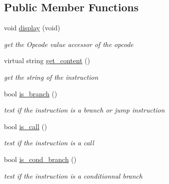 \subsection*{Public Member Functions}
\begin{DoxyCompactItemize}
\item 
void \mbox{\hyperlink{class_instruction_a0bae837f79caa83504ad14172bf6addf}{display}} (void)
\begin{DoxyCompactList}\small\item\em get the Opcode value accessor of the opcode \end{DoxyCompactList}\item 
\mbox{\label{class_instruction_a5b258bf1dfb9f6fa2fff0af0e7c211d8}} 
virtual string \mbox{\hyperlink{class_instruction_a5b258bf1dfb9f6fa2fff0af0e7c211d8}{get\+\_\+content}} ()
\begin{DoxyCompactList}\small\item\em get the string of the instruction \end{DoxyCompactList}\item 
\mbox{\label{class_instruction_aab8e6a16b8bab5ca90b554086cc3c825}} 
bool \mbox{\hyperlink{class_instruction_aab8e6a16b8bab5ca90b554086cc3c825}{is\+\_\+branch}} ()
\begin{DoxyCompactList}\small\item\em test if the instruction is a branch or jump instruction \end{DoxyCompactList}\item 
\mbox{\label{class_instruction_ab2a6352a09271a588f6930852a361f67}} 
bool \mbox{\hyperlink{class_instruction_ab2a6352a09271a588f6930852a361f67}{is\+\_\+call}} ()
\begin{DoxyCompactList}\small\item\em test if the instruction is a call \end{DoxyCompactList}\item 
\mbox{\label{class_instruction_a1b607074554bc160142786c125bde530}} 
bool \mbox{\hyperlink{class_instruction_a1b607074554bc160142786c125bde530}{is\+\_\+cond\+\_\+branch}} ()
\begin{DoxyCompactList}\small\item\em test if the instruction is a conditionnal branch \end{DoxyCompactList}\item 

\end{DoxyCompactItemize}

